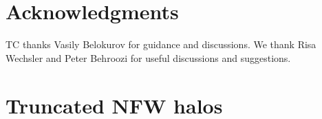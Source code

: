 \documentclass[useAMS,usenatbib]{mn2e}
\begin{document}






\section*{Acknowledgments}
 
TC thanks Vasily Belokurov for guidance and discussions.
We thank Risa Wechsler and Peter Behroozi for useful discussions and 
suggestions.



\appendix

\section{Truncated NFW halos}
\label{appendix:halos}
\end{document}
